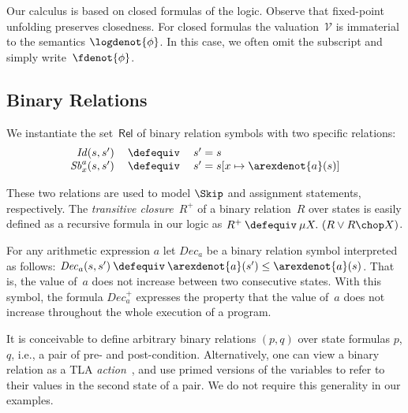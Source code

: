 \documentclass[a4paper,numberwithinsect]{lipics-v2021}
\begin{document}
Our calculus is based on closed formulas of the logic.  Observe that
fixed-point unfolding preserves closedness.  For closed formulas the
valuation~$\mathcal{V}$ is immaterial to the semantics
$\logdenot{\phi}$. In this case, we often omit the subscript and
simply write~$\fdenot{\phi}$.


\subsection{Binary Relations}
\label{sec:binary-relations}

We instantiate the set~$\mathsf{Rel}$ of binary relation symbols with
two specific relations:
% 
$$
\begin{array}{rcl}
  \mathit{Id} (s, s')  &  
                         \>\defequiv\>  &  
                                          s' = s \\
  \mathit{Sb}^{a}_{x} (s, s')  &  
                                 \>\defequiv\>  &  
                                                  s' = s[x \mapsto \arexdenot{a} (s)]
\end{array}
$$

These two relations are used to model $\Skip$ and assignment
statements, respectively.
%
The \emph{transitive closure}~$R^+$ of a binary relation~$R$ over
states is easily defined as a recursive formula in our logic as
%
$ R^+ \>\defequiv\> \mu X.\ (R \vee R \chop X) $.


\begin{example}
  \label{ex:form-1}
  For any arithmetic expression $a$ let $\mathit{Dec}_a$ be a binary
  relation symbol interpreted as follows:
  $
  \mathit{Dec}_a (s, s')  \>\defequiv\> 
  \arexdenot{a} (s') \leq \arexdenot{a} (s)
  $.
  That is, the value of~$a$ does not increase between two consecutive
  states.
  With this symbol, the formula $\mathit{Dec}_a^+$ expresses the
  property that the value of~$a$ does not increase throughout the
  whole execution of a program.
\end{example}

\begin{remark}
  It is conceivable to define arbitrary binary relations $(p,q)$ over
  state formulas $p$, $q$, i.e., a pair of pre- and post-condition.
  Alternatively, one can view a binary relation as a TLA
  \emph{action}~\cite{lam-94-tla}, and use primed versions of the
  variables to refer to their values in the second state of a pair.
  We do not require this generality in our examples.
\end{remark}
\end{document}
